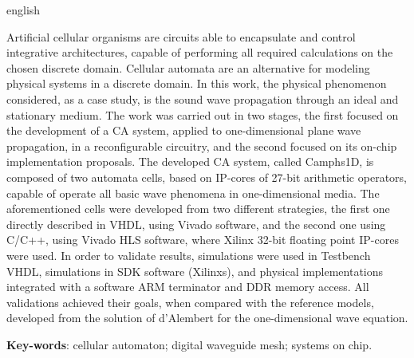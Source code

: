 \begin{resumo}[Abstract]
 \begin{otherlanguage*}{english}
  
 Artificial cellular organisms are circuits able to encapsulate and control integrative architectures, capable of performing all required calculations on the chosen discrete domain. Cellular automata are an alternative for modeling physical systems in a discrete domain. In this work, the physical phenomenon considered, as a case study, is the sound wave propagation through an ideal and stationary medium. The work was carried out in two stages, the first focused on the development of a CA system, applied to one-dimensional plane wave propagation, in a reconfigurable circuitry, and the second focused on its on-chip implementation proposals. The developed CA system, called Camphs1D, is composed of two automata cells, based on IP-cores of 27-bit arithmetic operators, capable of operate all basic wave phenomena in one-dimensional media. The aforementioned cells were developed from two different strategies, the first one directly described in VHDL, using Vivado software, and the second one using C/C++, using Vivado HLS software, where Xilinx 32-bit floating point IP-cores were used. In order to validate results, simulations were used in Testbench VHDL, simulations in SDK software (Xilinxs), and physical implementations integrated with a software ARM terminator and DDR memory access. All validations achieved their goals, when compared with the reference models, developed from the solution of d'Alembert for the one-dimensional wave equation.
 
 \vspace{\onelineskip}
 
 \noindent 
 \textbf{Key-words}: cellular automaton; digital waveguide mesh; systems on chip.
 \end{otherlanguage*}
\end{resumo}
